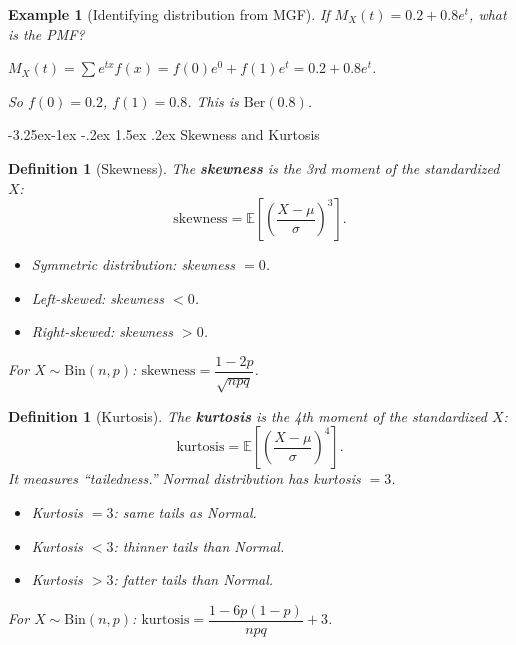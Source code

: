 \documentclass{article}
\makeatletter
\newtheorem{definition}[theorem]{Definition}
\newtheorem{example}{Example}[section]
\theoremstyle{remark}
\newlength{\subsecindent}
\renewcommand\subsection{\@startsection{subsection}{2}{\subsecindent}%
  {-3.25ex\@plus -1ex \@minus -.2ex}%
  {1.5ex \@plus .2ex}%
  {\normalfont\large\bfseries}}
\newenvironment{sub}{%
  \begin{list}{}{%
    \setlength{\leftmargin}{4em}%
    \setlength{\rightmargin}{0pt}%
    \setlength{\topsep}{0pt}%
    \setlength{\partopsep}{0pt}%
    \setlength{\parsep}{\parskip}%
    \setlength{\itemsep}{\parskip}%
  }\item\relax
}{\end{list}}
\newcommand{\E}{\mathbb{E}}
\makeatother
\begin{document}
\begin{sub}
\begin{example}[Identifying distribution from MGF]
  If $M_X(t) = 0.2 + 0.8 e^t$, what is the PMF?

  $M_X(t) = \sum e^{tx} f(x) = f(0) e^{0} + f(1) e^{t} = 0.2 + 0.8 e^t$.

  So $f(0) = 0.2$, $f(1) = 0.8$. This is $\text{Ber}(0.8)$.
\end{example}

\end{sub}

\subsection{Skewness and Kurtosis}
\begin{sub}

\begin{definition}[Skewness]
  The \textbf{skewness} is the 3rd moment of the standardized $X$:
  \[
    \text{skewness} = \E\!\left[\left(\frac{X - \mu}{\sigma}\right)^3\right].
  \]
  \begin{itemize}
    \item Symmetric distribution: skewness $= 0$.
    \item Left-skewed: skewness $< 0$.
    \item Right-skewed: skewness $> 0$.
  \end{itemize}
  For $X \sim \text{Bin}(n,p)$: $\text{skewness} = \dfrac{1 - 2p}{\sqrt{npq}}$.
\end{definition}

\begin{definition}[Kurtosis]
  The \textbf{kurtosis} is the 4th moment of the standardized $X$:
  \[
    \text{kurtosis} = \E\!\left[\left(\frac{X - \mu}{\sigma}\right)^4\right].
  \]
  It measures ``tailedness.'' Normal distribution has kurtosis $= 3$.
  \begin{itemize}
    \item Kurtosis $= 3$: same tails as Normal.
    \item Kurtosis $< 3$: thinner tails than Normal.
    \item Kurtosis $> 3$: fatter tails than Normal.
  \end{itemize}
  For $X \sim \text{Bin}(n,p)$: $\text{kurtosis} = \dfrac{1 - 6p(1-p)}{npq} + 3$.
\end{definition}

\end{sub}
\end{document}
